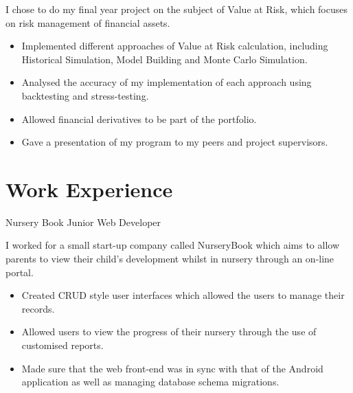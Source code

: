 \documentclass[10pt,a4paper]{moderncv}
\begin{document}
        {
        I chose to do my final year project on the subject of Value at Risk, which focuses on risk management of financial assets.
        \begin{itemize}
            \item Implemented different approaches of Value at Risk calculation, including Historical Simulation, Model Building and Monte Carlo Simulation.
            \item Analysed the accuracy of my implementation of each approach using backtesting and stress-testing.
            \item Allowed financial derivatives to be part of the portfolio.
            \item Gave a presentation of my program to my peers and project supervisors.
        \end{itemize}
        }
    
        \section{Work Experience}
        {Nursery Book}
        {Junior Web Developer}
        {}
        {}
        {
        I worked for a small start-up company called NurseryBook which aims to allow parents to view their child's development whilst in nursery through an on-line portal.
        \begin{itemize}
            \item Created CRUD style user interfaces which allowed the users to manage their records.
            \item Allowed users to view the progress of their nursery through the use of customised reports.
            \item Made sure that the web front-end was in sync with that of the Android application as well as managing database schema migrations.
        \end{itemize}
        }
    
\end{document}
